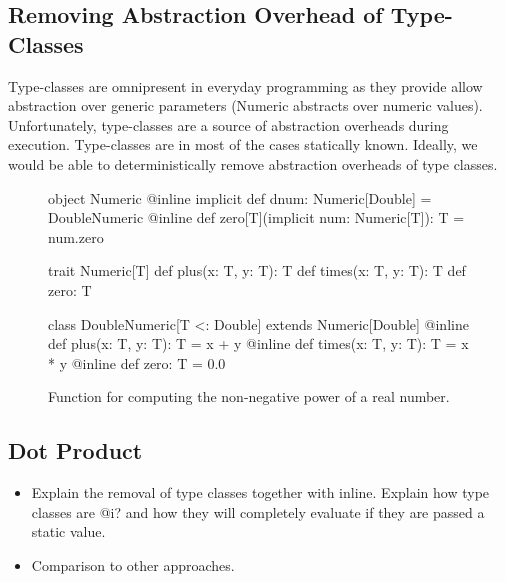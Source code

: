 \subsection{Removing Abstraction Overhead of Type-Classes}
\label{sct:type-classes-removal}
Type-classes are omnipresent in everyday programming as they provide allow abstraction over
 generic parameters (\eg Numeric abstracts over numeric values). Unfortunately,
 type-classes are a source of abstraction overheads during execution. Type-classes
 are in most of the cases statically known. Ideally, we would be able to
 deterministically remove abstraction overheads of type classes.

\begin{figure}
\begin{listing}
object Numeric {
  @inline implicit def dnum: Numeric[Double] =
    DoubleNumeric
  @inline def zero[T](implicit num: Numeric[T]): T =
    num.zero
}

trait Numeric[T] {
  def plus(x: T, y: T): T
  def times(x: T, y: T): T
  def zero: T
}

class DoubleNumeric[T <: Double] extends Numeric[Double] {
  @inline def plus(x: T, y: T): T = x + y
  @inline def times(x: T, y: T): T = x * y
  @inline def zero: T = 0.0
}
\end{listing}
\caption{\label{fig:numeric} Function for computing the non-negative power of a real number.}
\end{figure}


\subsection{Dot Product}
\label{sct:dot-product}
\begin{itemize}
  \item Explain the removal of type classes together with inline. Explain how type classes
  are @i? and how they will completely evaluate if they are passed a static value.
  \item Comparison to other approaches.
\end{itemize}

